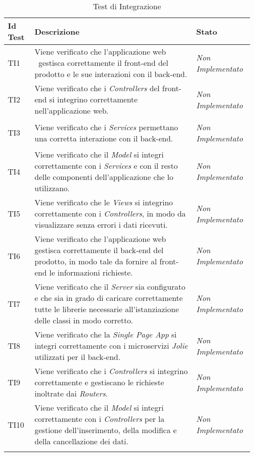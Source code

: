 	\normalsize
	\begin{longtable}{|>{\centering\arraybackslash}p{1.5cm}|>{\centering\arraybackslash}p{8cm} | >{\centering\arraybackslash}p{3.8cm}|}
		\hline \rowcolor{Gray}
		\textbf{Id Test} & \textbf{Descrizione} & \textbf{Stato}\\
		\hline
		\endhead
		\hypertarget{TI1}{TI1} & Viene verificato che l’applicazione web \progetto\ gestisca
		correttamente il front-end del prodotto e le sue interazioni con il back-end. & \textit{Non Implementato}\\ \hline
		\hypertarget{TI2}{TI2} & Viene verificato che i \textit{Controllers} del front-end si integrino
		correttamente nell’applicazione web. & \textit{Non Implementato}\\ \hline
		\hypertarget{TI3}{TI3} & Viene verificato che i \textit{Services} permettano una corretta interazione con il back-end. & \textit{Non Implementato}\\ \hline
		\hypertarget{TI4}{TI4} & Viene verificato che il \textit{Model} si integri correttamente con i
		\textit{Services} e con il resto delle componenti dell’applicazione che lo utilizzano. & \textit{Non Implementato}\\ \hline
		\hypertarget{TI5}{TI5} & Viene verificato che le \textit{Views} si integrino correttamente con i
		\textit{Controllers}, in modo da visualizzare senza errori i dati ricevuti. & \textit{Non Implementato}\\ \hline
		\hypertarget{TI6}{TI6} & Viene verificato che l’applicazione web gestisca	correttamente il back-end del prodotto, in modo tale da fornire al front-end le informazioni richieste. & \textit{Non Implementato}\\ \hline
		\hypertarget{TI7}{TI7} & Viene verificato che il \textit{Server} sia configurato e che sia in grado di caricare correttamente tutte le librerie necessarie all'istanziazione delle classi in modo corretto. & \textit{Non Implementato}\\ \hline
		\hypertarget{TI8}{TI8} & Viene verificato che la \textit{Single Page App} si integri correttamente con i microservizi \textit{Jolie} utilizzati per il back-end. & \textit{Non Implementato}\\ \hline
		\hypertarget{TI9}{TI9} & Viene verificato che i \textit{Controllers} si integrino correttamente
		e gestiscano le richieste inoltrate dai \textit{Routers}. & \textit{Non Implementato}\\ \hline
		\hypertarget{TI10}{TI10} & Viene verificato che il \textit{Model} si integri correttamente con i
		\textit{Controllers} per la gestione dell’inserimento, della modifica e della cancellazione dei dati. & \textit{Non Implementato}\\ \hline
		\caption[Test di Integrazione]{Test di Integrazione}
		\label{tabella:test2}
	\end{longtable}
	\clearpage
	

